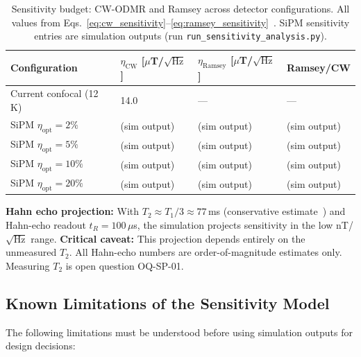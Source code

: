 \begin{table}[ht]
\centering
\caption{Sensitivity budget: CW-ODMR and Ramsey across detector configurations.
  All values from Eqs.~\eqref{eq:cw_sensitivity}--\eqref{eq:ramsey_sensitivity}~\cite{Barry2020}.
  SiPM sensitivity entries are simulation outputs (run \texttt{run\_sensitivity\_analysis.py}).}
\label{tab:sensitivity_budget}
\small
\begin{tabular}{@{}p{5.5cm}p{2.5cm}p{2.5cm}p{2cm}@{}}
\toprule
Configuration
  & $\eta_\mathrm{CW}$ [$\mu$T/$\sqrt{\text{Hz}}$]
  & $\eta_\mathrm{Ramsey}$ [$\mu$T/$\sqrt{\text{Hz}}$]
  & Ramsey/CW \\
\midrule
Current confocal (12\,K) & 14.0 & --- & --- \\
SiPM $\eta_\mathrm{opt} = 2\%$ & (sim output) & (sim output) & (sim output) \\
SiPM $\eta_\mathrm{opt} = 5\%$ & (sim output) & (sim output) & (sim output) \\
SiPM $\eta_\mathrm{opt} = 10\%$ & (sim output) & (sim output) & (sim output) \\
SiPM $\eta_\mathrm{opt} = 20\%$ & (sim output) & (sim output) & (sim output) \\
\bottomrule
\end{tabular}
\end{table}

\textbf{Hahn echo projection:} With $T_2 \approx T_1/3 \approx 77$\,ms (conservative
estimate~\cite{Jarmola2012}) %
and Hahn-echo readout $t_R = 100\,\mu$s, the simulation projects sensitivity in the low
nT/$\sqrt{\text{Hz}}$ range. \textbf{Critical caveat:} This projection depends entirely on
the unmeasured $T_2$. All Hahn-echo numbers are order-of-magnitude estimates only.
Measuring $T_2$ is open question OQ-SP-01.

\subsection{Known Limitations of the Sensitivity Model}
\label{sec:sensitivity_limits}

The following limitations must be understood before using simulation outputs for design
decisions:

